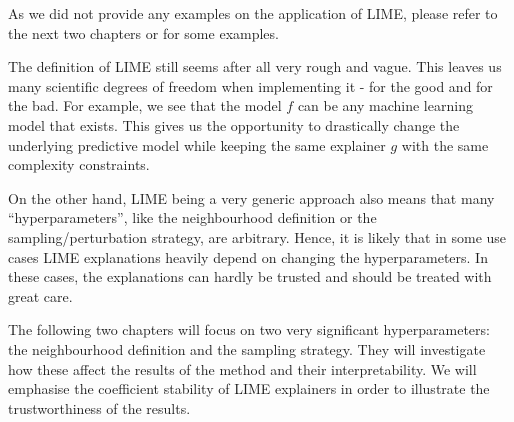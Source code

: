 \documentclass[
]{krantz}
\begin{document}
As we did not provide any examples on the application of LIME, please refer to the next two chapters or \citet{molnar2019} for some examples.

The definition of LIME still seems after all very rough and vague.
This leaves us many scientific degrees of freedom when implementing it - for the good and for the bad.
For example, we see that the model \(f\) can be any machine learning model that exists.
This gives us the opportunity to drastically change the underlying predictive model while keeping the same explainer \(g\) with the same complexity constraints.

On the other hand, LIME being a very generic approach also means that many ``hyperparameters'', like the neighbourhood definition or the sampling/perturbation strategy, are arbitrary.
Hence, it is likely that in some use cases LIME explanations heavily depend on changing the hyperparameters.
In these cases, the explanations can hardly be trusted and should be treated with great care.

The following two chapters will focus on two very significant hyperparameters:
the neighbourhood definition and the sampling strategy.
They will investigate how these affect the results of the method and their interpretability.
We will emphasise the coefficient stability of LIME explainers in order to illustrate the trustworthiness of the results.

  

\backmatter
\printindex
\end{document}
